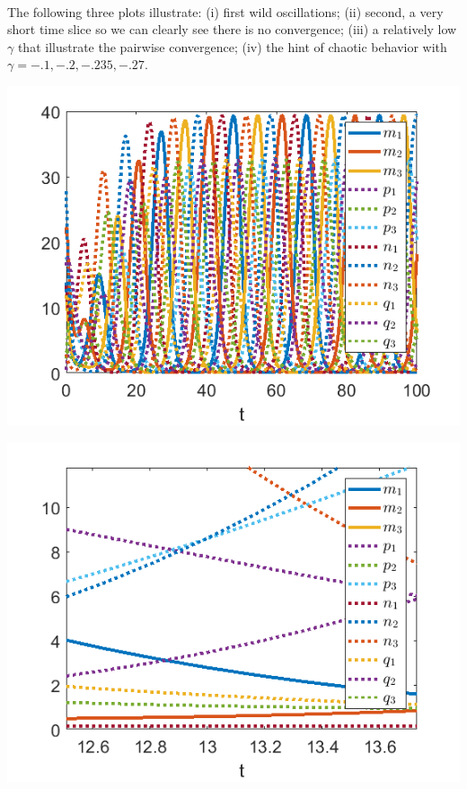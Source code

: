 \documentclass{article}
\begin{document}
\\
The following three plots illustrate: (i) first wild oscillations; (ii) second, a very short time slice so we can clearly see there is no convergence; (iii) a relatively low $\gamma$ that illustrate the pairwise convergence; (iv) the hint of chaotic behavior with $\gamma = -.1, -.2, -.235, -.27$.
\begin{center}
    \includegraphics[scale = .8]{part_1_oscillations.png}
\end{center}
\begin{center}
    \includegraphics[scale = .8]{part_1_closeup.png}
\end{center}
\end{document}
